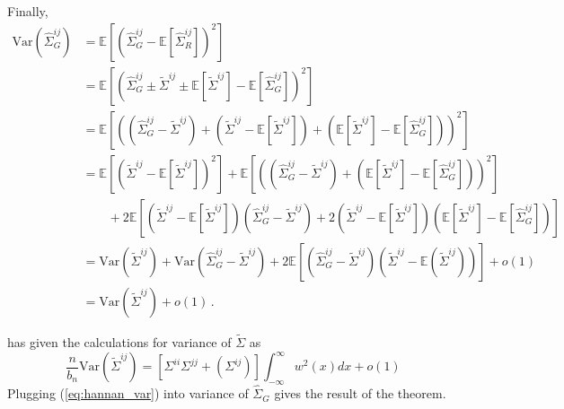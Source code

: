 \documentclass[11pt]{article}
\newcommand{\E}{\mathbb{E}}
\newcommand{\Var}{\text{Var}}
\theoremstyle{remark}
\begin{document}
%
Finally,
\begin{align*}
 \Var\left(\hat{\Sigma}_{G}^{ij} \right)  & = \E \left[ \left(\hat{\Sigma}_{G}^{ij}  - \E \left[\hat{\Sigma}_{R}^{ij}  \right] \right)^2 \right]\\
& = \E \left[ \left(\hat{\Sigma}_{G}^{ij} \pm \tilde{\Sigma}^{ij} \pm \E \left[ \tilde{\Sigma}^{ij}\right] - \E \left[\hat{\Sigma}_{G}^{ij}  \right] \right)^2 \right]\\
& = \E\left[ \left( \left(\hat{\Sigma}_{G}^{ij} - \tilde{\Sigma}^{ij} \right) + \left(\tilde{\Sigma}^{ij}  - \E\left[\tilde{\Sigma}^{ij}\right]\right) + \left(\E\left[\tilde{\Sigma}^{ij}\right] - \E \left[\hat{\Sigma}_{G}^{ij}  \right] \right)  \right)^2 \right] \\ 
& =  \E\left[ \left(\tilde{\Sigma}^{ij}  - \E\left[\tilde{\Sigma}^{ij}\right]\right)^2 \right] + \E \left[ \left(\left(\hat{\Sigma}_{G}^{ij} - \tilde{\Sigma}^{ij} \right) + \left(\E\left[\tilde{\Sigma}^{ij}\right] - \E \left[\hat{\Sigma}_{G}^{ij}  \right] \right) \right)^2 \right] \\
& \quad \quad + 2\E\left[\left(\tilde{\Sigma}^{ij}  - \E\left[\tilde{\Sigma}^{ij}\right]\right) \left(\hat{\Sigma}_{G}^{ij} - \tilde{\Sigma}^{ij} \right) + 2 \left(\tilde{\Sigma}^{ij}  - \E\left[\tilde{\Sigma}^{ij}\right]\right) \left(\E \left[\tilde{\Sigma}^{ij}\right] - \E \left[\hat{\Sigma}_{G}^{ij}  \right] \right)\right]\\
& = \Var\left( \tilde{\Sigma}^{ij}\right) + \Var\left(\hat{\Sigma}_{G}^{ij} - \tilde{\Sigma}^{ij} \right) + 2 \E\left[ \left(\hat{\Sigma}_{G}^{ij} -  \tilde{\Sigma}^{ij} \right) \left(\tilde{\Sigma}^{ij}  - \E \left( \tilde{\Sigma}^{ij} \right) \right) \right] + o(1)\\
& = \Var\left( \tilde{\Sigma}^{ij}\right) + o(1)\,.
\end{align*}

\cite{hannan2009multiple} has given the calculations for variance of $\tilde{\Sigma}$ as 
\begin{equation} \label{eq:hannan_var}
\dfrac{n}{b_n}\Var(\tilde{\Sigma}^{ij}) = \left[\Sigma^{ii}\Sigma^{jj} + \left(\Sigma^{ij} \right) \right]\int_{-\infty}^{\infty}w^2(x)dx + o(1)    
\end{equation}
Plugging (\ref{eq:hannan_var}) into variance of $\hat{\Sigma}_{G}$ gives the result of the theorem.
 
\end{document}
